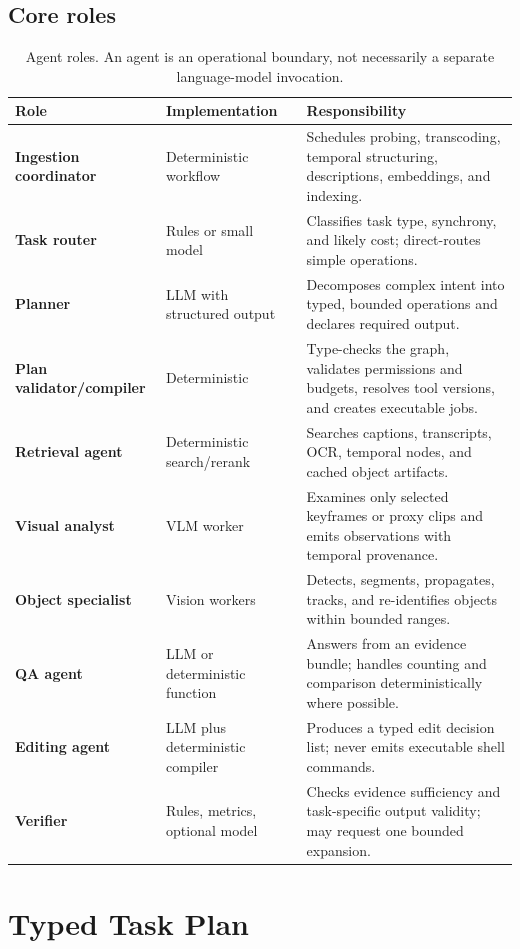 \documentclass[11pt]{article}
\begin{document}
\subsection{Core roles}

\begin{table}[ht]
\centering
\small
\begin{tabularx}{\textwidth}{>{\bfseries}p{31mm} p{28mm} X}
\toprule
Role & Implementation & Responsibility \\
\midrule
Ingestion coordinator & Deterministic workflow & Schedules probing,
transcoding, temporal structuring, descriptions, embeddings, and indexing. \\
Task router & Rules or small model & Classifies task type, synchrony, and likely
cost; direct-routes simple operations. \\
Planner & LLM with structured output & Decomposes complex intent into typed,
bounded operations and declares required output. \\
Plan validator/compiler & Deterministic & Type-checks the graph, validates
permissions and budgets, resolves tool versions, and creates executable jobs. \\
Retrieval agent & Deterministic search/rerank & Searches captions, transcripts,
OCR, temporal nodes, and cached object artifacts. \\
Visual analyst & VLM worker & Examines only selected keyframes or proxy clips and
emits observations with temporal provenance. \\
Object specialist & Vision workers & Detects, segments, propagates, tracks, and
re-identifies objects within bounded ranges. \\
QA agent & LLM or deterministic function & Answers from an evidence bundle;
handles counting and comparison deterministically where possible. \\
Editing agent & LLM plus deterministic compiler & Produces a typed edit decision
list; never emits executable shell commands. \\
Verifier & Rules, metrics, optional model & Checks evidence sufficiency and
task-specific output validity; may request one bounded expansion. \\
\bottomrule
\end{tabularx}
\caption{Agent roles. An agent is an operational boundary, not necessarily a
separate language-model invocation.}
\end{table}

\section{Typed Task Plan}
\end{document}
